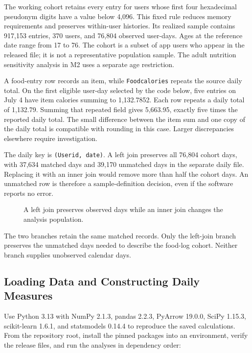 The working cohort retains every entry for users whose first four
hexadecimal pseudonym digits have a value below 4,096. This fixed rule
reduces memory requirements and preserves within-user histories. Its
realized sample contains 917,153 entries, 370 users, and 76,804 observed
user-days. Ages at the reference date range from 17 to 76. The cohort is
a subset of app users who appear in the released file; it is not a
representative population sample. The adult nutrition sensitivity
analysis in M2 uses a separate age restriction.

A food-entry row records an item, while \texttt{Foodcalories} repeats
the source daily total. On the first eligible user-day selected by the
code below, five entries on July 4 have item calories summing to
1,132.7852. Each row repeats a daily total of 1,132.79. Summing that
repeated field gives 5,663.95, exactly five times the reported daily
total. The small difference between the item sum and one copy of the
daily total is compatible with rounding in this case. Larger
discrepancies elsewhere require investigation.

The daily key is \texttt{(Userid,\ date)}. A left join preserves all
76,804 cohort days, with 37,634 matched days and 39,170 unmatched days
in the separate daily file. Replacing it with an inner join would remove
more than half the cohort days. An unmatched row is therefore a
sample-definition decision, even if the software reports no error.

\begin{figure}[htbp]
\centering

\caption{A left join preserves observed days while an inner join changes the analysis population.}\label{fig:M01_mhealth_join}
\end{figure}

The two branches retain the same matched records. Only the left-join
branch preserves the unmatched days needed to describe the food-log
cohort. Neither branch supplies unobserved calendar days.

\hypertarget{M01-loading-data-and-constructing-daily-measures}{%
\subsection{Loading Data and Constructing Daily
Measures}\label{M01-loading-data-and-constructing-daily-measures}}

\noindent Use Python 3.13 with NumPy 2.1.3, pandas 2.2.3, PyArrow 19.0.0, SciPy
1.15.3, scikit-learn 1.6.1, and statsmodels 0.14.4 to reproduce the
saved calculations. From the repository root, install the pinned
packages into an environment, verify the release files, and run the
analyses in dependency order:

